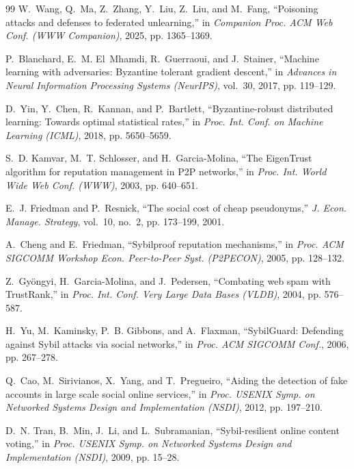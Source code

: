 \documentclass[lettersize,journal]{IEEEtran}
\begin{document}
\begin{thebibliography}{99}
W.~Wang, Q.~Ma, Z.~Zhang, Y.~Liu, Z.~Liu, and M.~Fang, ``Poisoning attacks and
  defenses to federated unlearning,'' in \emph{Companion Proc. ACM
  Web Conf. (WWW Companion)}, 2025, pp. 1365--1369.

P.~Blanchard, E.~M. El~Mhamdi, R.~Guerraoui, and J.~Stainer, ``Machine learning
  with adversaries: Byzantine tolerant gradient descent,'' in \emph{Advances in
  Neural Information Processing Systems (NeurIPS)}, vol.~30, 2017, pp.
  119--129.

D.~Yin, Y.~Chen, R.~Kannan, and P.~Bartlett, ``Byzantine-robust distributed
  learning: Towards optimal statistical rates,'' in \emph{Proc. Int. Conf. on Machine Learning (ICML)}, 2018, pp. 5650--5659.

S.~D. Kamvar, M.~T. Schlosser, and H.~Garcia-Molina, ``The {EigenTrust}
  algorithm for reputation management in {P2P} networks,'' in \emph{Proc.
  Int. World Wide Web Conf. (WWW)}, 2003, pp. 640--651.

E.~J. Friedman and P.~Resnick, ``The social cost of cheap pseudonyms,'' \emph{J. Econ. Manage. Strategy}, vol.~10, no.~2, pp. 173--199, 2001.

A.~Cheng and E.~Friedman, ``Sybilproof reputation mechanisms,'' in \emph{Proc. ACM SIGCOMM Workshop Econ. Peer-to-Peer Syst. (P2PECON)}, 2005, pp. 128--132.

Z.~Gy{\"o}ngyi, H.~Garcia-Molina, and J.~Pedersen, ``Combating web spam with {TrustRank},'' in \emph{Proc. Int. Conf. Very Large Data Bases (VLDB)}, 2004, pp. 576--587.

H.~Yu, M.~Kaminsky, P.~B. Gibbons, and A.~Flaxman, ``{SybilGuard}: Defending
  against {Sybil} attacks via social networks,'' in \emph{Proc. ACM SIGCOMM Conf.}, 2006, pp. 267--278.

Q.~Cao, M.~Sirivianos, X.~Yang, and T.~Pregueiro, ``Aiding the detection of
  fake accounts in large scale social online services,'' in \emph{Proc.
  USENIX Symp. on Networked Systems Design and Implementation
  (NSDI)}, 2012, pp. 197--210.

D.~N. Tran, B.~Min, J.~Li, and L.~Subramanian, ``Sybil-resilient online content
  voting,'' in \emph{Proc. USENIX Symp. on Networked Systems
  Design and Implementation (NSDI)}, 2009, pp. 15--28.


\end{thebibliography}
\end{document}
